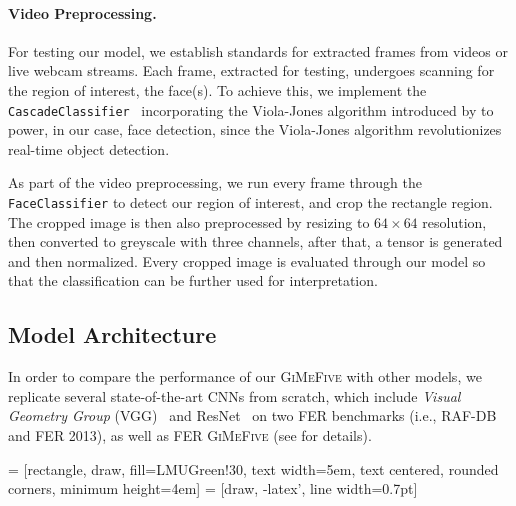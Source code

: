 \paragraph{Video Preprocessing.}
For testing our model, we establish standards for extracted frames from videos or live webcam streams. 
Each frame, extracted for testing, undergoes scanning for the region of interest, the face(s). 
To achieve this, 
we implement the \texttt{CascadeClassifier}~\cite{casc_class} incorporating the Viola-Jones algorithm introduced by \citet{990517} to power, 
in our case, face detection, 
since the Viola-Jones algorithm revolutionizes real-time object detection. 

As part of the video preprocessing, 
we run every frame through the \texttt{FaceClassifier} to detect our region of interest, 
and crop the rectangle region. 
The cropped image is then also preprocessed by resizing to $64 \times 64$ resolution, 
then converted to greyscale with three channels, 
after that, a tensor is generated and then normalized. 
Every cropped image is evaluated through our model so that the classification can be further used for interpretation. 

\subsection{Model Architecture}
\label{sec:setup:model}

In order to compare the performance of our \textsc{GiMeFive} with other models, 
we replicate several state-of-the-art CNNs from scratch, 
which include \textit{Visual Geometry Group} (VGG)~\cite{SimonyanZ14a} and 
ResNet~\cite{HeZRS16} on two FER benchmarks (i.e., RAF-DB and FER 2013), 
as well as FER \textsc{GiMeFive} (see  for details). 

 = [rectangle, draw, fill=LMUGreen!30, text width=5em, text centered, rounded corners, minimum height=4em]
 = [draw, -latex', line width=0.7pt]

